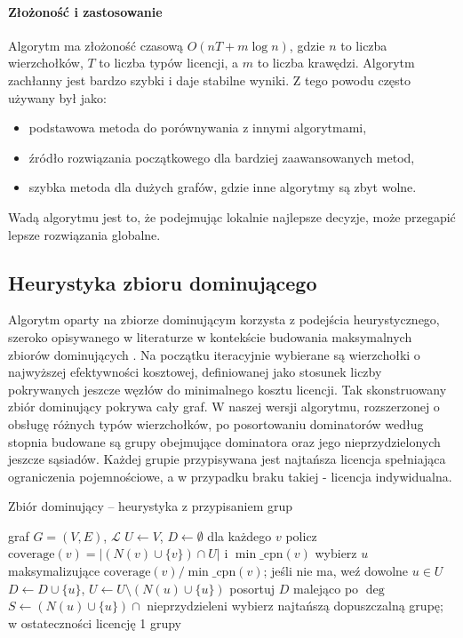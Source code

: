 \paragraph{Złożoność i zastosowanie}
Algorytm ma złożoność czasową $O(nT + m\log n)$, gdzie $n$ to liczba wierzchołków, $T$ to liczba typów licencji, a $m$ to liczba krawędzi.
Algorytm zachłanny jest bardzo szybki i daje stabilne wyniki. Z tego powodu często używany był jako:
\begin{itemize}
  \item podstawowa metoda do porównywania z innymi algorytmami,
  \item źródło rozwiązania początkowego dla bardziej zaawansowanych metod,
  \item szybka metoda dla dużych grafów, gdzie inne algorytmy są zbyt wolne.
\end{itemize}
Wadą algorytmu jest to, że podejmując lokalnie najlepsze decyzje, może przegapić lepsze rozwiązania globalne.

\subsection{Heurystyka zbioru dominującego}\label{subsec:ds}

Algorytm oparty na zbiorze dominującym korzysta z podejścia heurystycznego, szeroko opisywanego w literaturze w kontekście budowania maksymalnych zbiorów dominujących \cite{haynes1998domination}. 
Na początku iteracyjnie wybierane są wierzchołki o najwyższej efektywności kosztowej, definiowanej jako stosunek liczby pokrywanych jeszcze węzłów do minimalnego kosztu licencji. 
Tak skonstruowany zbiór dominujący pokrywa cały graf. 
W naszej wersji algorytmu, rozszerzonej o obsługę różnych typów wierzchołków, po posortowaniu dominatorów według stopnia budowane są grupy obejmujące dominatora oraz jego nieprzydzielonych jeszcze sąsiadów.
Każdej grupie przypisywana jest najtańsza licencja spełniająca ograniczenia pojemnościowe, a w przypadku braku takiej - licencja indywidualna.

\begin{algorithm}[H]
  \caption{Zbiór dominujący -- heurystyka z przypisaniem grup}
  \label{alg:ds}
  \begin{algorithmic}[1]
    \Require graf $G=(V,E)$, $\mathcal{L}$
    \State $U\gets V$, $D\gets\emptyset$
    \State dla każdego $v$ policz $\mathrm{coverage}(v)=|(N(v)\cup\{v\})\cap U|$ i $\min\_\mathrm{cpn}(v)$
    \State wybierz $u$ maksymalizujące $\mathrm{coverage}(v)/\min\_\mathrm{cpn}(v)$; jeśli nie ma, weź dowolne $u\in U$
    \State $D\gets D\cup\{u\}$, $U\gets U\setminus(N(u)\cup\{u\})$
    \EndWhile
    \State posortuj $D$ malejąco po $\deg$
    \State $S\gets(N(u)\cup\{u\})\cap$ nieprzydzieleni
    \State wybierz najtańszą dopuszczalną grupę; w ostateczności licencję 1
    \EndFor
    \State \Return grupy
  \end{algorithmic}
\end{algorithm}

